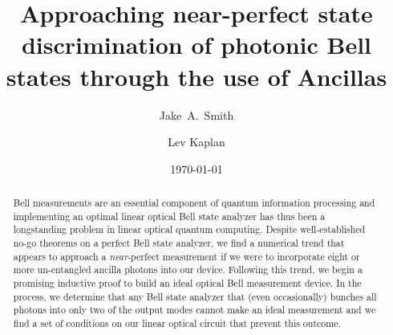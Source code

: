 \documentclass[aps,pra,twocolumn,showpacs,superscriptaddress,floatfix,10pt]{revtex4}
\begin{document}
\newcommand{\beq}{\begin{equation}}
\newcommand{\eeq}{\end{equation}}
\newcommand{\ben}{\begin{eqnarray}}
\newcommand{\een}{\end{eqnarray}}
\newcommand{\bea}{\begin{array}}
\newcommand{\eea}{\end{array}}
\newcommand{\om}{(\omega )}
\newcommand{\bef}{\begin{figure}}
\newcommand{\eef}{\end{figure}}
\newcommand{\leg}[1]{\caption{\protect\rm{\protect\footnotesize{#1}}}}
\newcommand{\ew}[1]{\langle{#1}\rangle}
\newcommand{\be}[1]{\mid\!{#1}\!\mid}
\newcommand{\no}{\nonumber}
\newcommand{\etal}{{\em et~al }}
\newcommand{\geff}{g_{\mbox{\it{\scriptsize{eff}}}}}
\newcommand{\da}[1]{{#1}^\dagger}
\newcommand{\cf}{{\it cf.\/}\ }
\newcommand{\ie}{{\it i.e.\/}\ }   

\newcommand{\spazio}{\vspace{0.3cm}}%
\newcommand{\de}[1]{\frac{\partial}{\partial{#1}}}
\newcommand{\U}{\tilde{U}}
\newcommand{\V}{\tilde{V}}


\title{Approaching near-perfect state discrimination of photonic Bell states through the use of Ancillas}

\author{Jake~A.~Smith}

\author{Lev Kaplan}

 \begin{abstract}
 	Bell measurements are an essential component of quantum information processing and implementing an optimal linear optical Bell state analyzer has thus been a longstanding problem in linear optical quantum computing. Despite well-established no-go theorems on a perfect Bell state analyzer, we find a numerical trend that appears to approach a \textit{near}-perfect measurement if we were to incorporate eight or more un-entangled ancilla photons into our device. Following this trend, we begin a promising inductive proof to build an ideal optical Bell measurement device. In the process, we determine that any Bell state analyzer that (even occasionally) bunches all photons into only two of the output modes cannot make an ideal measurement and we find a set of conditions on our linear optical circuit that prevent this outcome.
\end{abstract}                                                               
\date{\today}
\maketitle
\end{document}
